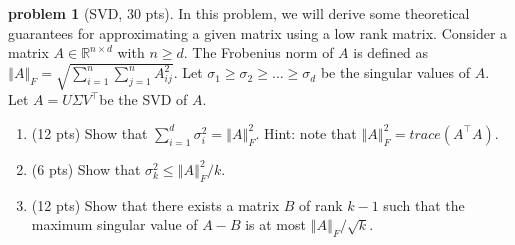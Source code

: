 \documentclass[10pt]{article}
\theoremstyle{definition}
\newtheorem{problem}{\sc\color{cit}problem}
\def\R{\mathbb{R}}%
\begin{document}
\begin{problem}[SVD, 30 pts]
In this problem, we will derive some theoretical guarantees for approximating
a given matrix using a low rank matrix. Consider a matrix $A\in\R^{n\times d}$
with $n\ge d$. The Frobenius norm of $A$ is defined as $\left\Vert A\right\Vert _{F}=\sqrt{\sum_{i=1}^{n}\sum_{j=1}^{n}A_{ij}^{2}}$.
Let $\sigma_{1}\ge\sigma_{2}\ge\ldots\ge\sigma_{d}$ be the singular
values of $A$. Let $A=U\Sigma V^{\top}$be the SVD of $A$.

\begin{enumerate}[label=(\alph*)]
\item  (12 pts) Show that $\sum_{i=1}^{d}\sigma_{i}^{2}=\left\Vert A\right\Vert _{F}^{2}$.
Hint: note that $\left\Vert A\right\Vert _{F}^{2}=trace\left(A^{\top}A\right)$.
\item (6 pts) Show that $\sigma_{k}^{2}\le\left\Vert A\right\Vert _{F}^{2}/k$.
\item (12 pts) Show that there exists a matrix $B$ of rank $k-1$ such that the
maximum singular value of $A-B$ is at most $\left\Vert A\right\Vert _{F}/\sqrt{k}$.
\end{enumerate}
\end{problem}
\end{document}
